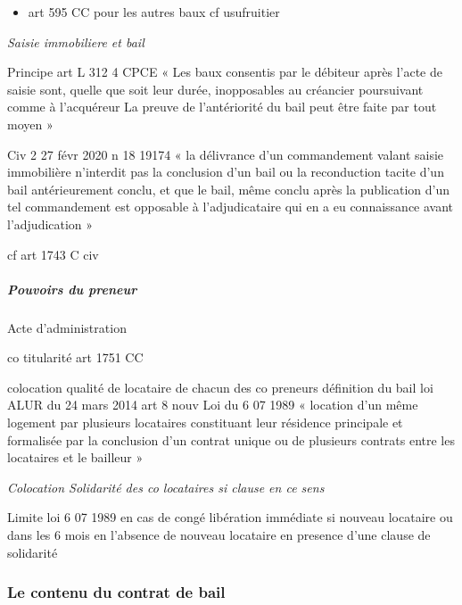 \documentclass[10pt,a4paper,twoside]{article}
\newenvironment*{focus}[1][]{\medskip \textbf{#1} \newline \itshape}{}
\begin{document}
\begin{enumerate}
\begin{itemize}
\begin{itemize}
									\item art 595 CC pour les autres baux cf usufruitier
								\end{itemize}
							\end{itemize}
					\end{enumerate}

					\begin{focus}{Saisie immobiliere et bail}

						Principe art L 312 4 CPCE « Les baux consentis par le débiteur
						après l'acte de saisie sont, quelle que soit leur durée,
						inopposables au créancier poursuivant comme à l'acquéreur La
						preuve de l'antériorité du bail peut être faite par tout moyen »

						Civ 2 27 févr 2020 n 18 19174 « la délivrance d'un
						commandement valant saisie immobilière n'interdit pas la
						conclusion d'un bail ou la reconduction tacite d'un bail
						antérieurement conclu, et que le bail, même conclu après la
						publication d'un tel commandement est opposable à
						l'adjudicataire qui en a eu connaissance avant l'adjudication »

						cf art 1743 C civ

					\end{focus}

				\subparagraph{Pouvoirs du preneur}

					Acte d’administration

					co titularité art 1751 CC

					colocation qualité de locataire de chacun des co
					preneurs définition du bail loi ALUR du 24 mars 2014
					art 8 nouv Loi du 6 07 1989 « location d'un même
					logement par plusieurs locataires constituant leur
					résidence principale et formalisée par la conclusion d'un
					contrat unique ou de plusieurs contrats entre les
					locataires et le bailleur »

					\begin{focus}{Colocation}
						Solidarité des co locataires si clause en ce sens

						Limite loi 6 07 1989 en cas de congé libération immédiate si nouveau locataire ou dans les 6 mois en l’absence de nouveau locataire en presence d’une clause de solidarité
					\end{focus}

		\subsubsection{Le contenu du contrat de bail}
\end{document}
